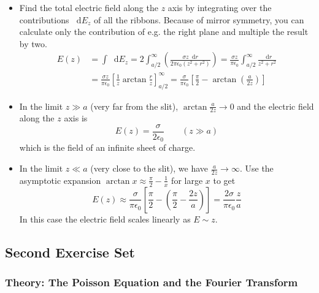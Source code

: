 \documentclass[11pt, a4paper]{article}
\newcommand{\diff}{\mathop{}\!\mathrm{d}} %
\begin{document}
\begin{itemize}
	\item Find the total electric field along the $ z $ axis by integrating over the contributions $ \diff E_{z} $ of all the ribbons. Because of mirror symmetry, you can calculate only the contribution of e.g. the right plane and multiple the result by two.
	\begin{align*}
		E(z) &= \int \diff E_{z} = 2 \int_{a/2}^{\infty} \left(\frac{\sigma z \diff r}{2\pi \epsilon_{0} (z^{2} + r^{2})}\right) = \frac{\sigma z}{\pi \epsilon_{0}} \int_{a/2}^{\infty} \frac{\diff r}{z^{2} + r^{2}}\\
		&= \frac{\sigma z}{\pi \epsilon_{0}} \left[\frac{1}{z}\arctan \frac{r}{z}\right]_{a/2}^{\infty} = \frac{\sigma}{\pi \epsilon_{0}} \left[\frac{\pi}{2} - \arctan(\frac{a}{2z})\right]
	\end{align*}
	
	\item In the limit $ z \gg a $ (very far from the slit), $ \arctan\frac{a}{2z} \to 0 $ and the electric field along the $ z $ axis is 
	\begin{equation*}
		E(z) = \frac{\sigma}{2 \epsilon_{0}} \qquad (z \gg a)
	\end{equation*}
	which is the field of an infinite sheet of charge.
	
	\item In the limit $ z \ll a $ (very close to the slit), we have $ \frac{a}{2z} \to \infty $. Use the asymptotic expansion $ \arctan x \approx \frac{\pi}{2} - \frac{1}{x} $ for large $ x $ to get
	\begin{equation*}
		E(z) \approx \frac{\sigma}{\pi \epsilon_{0}} \left[\frac{\pi}{2} - \left(\frac{\pi}{2} - \frac{2z}{a}\right)\right] = \frac{2\sigma}{\pi \epsilon_{0}} \frac{z}{a}
	\end{equation*}
	In this case the electric field scales linearly as $ E \sim z $. 
\end{itemize} 


\subsection{Second Exercise Set}
\subsubsection{Theory: The Poisson Equation and the Fourier Transform}
\end{document}

